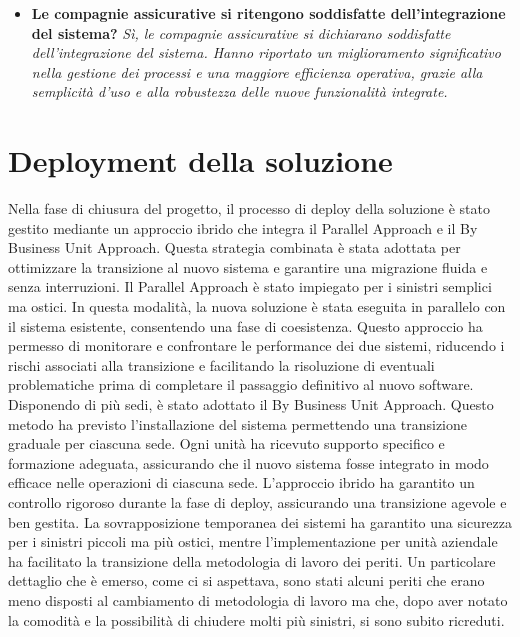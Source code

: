 \documentclass[a4paper,12pt, openright]{report}
\begin{document}
\begin{itemize}
    \item \textbf{Le compagnie assicurative si ritengono soddisfatte dell'integrazione del sistema?}
    \textit{Sì, le compagnie assicurative si dichiarano soddisfatte dell'integrazione del sistema. Hanno riportato un miglioramento significativo nella gestione dei processi e una maggiore efficienza operativa, grazie alla semplicità d'uso e alla robustezza delle nuove funzionalità integrate.}
    
\end{itemize}

\section{Deployment della soluzione}
Nella fase di chiusura del progetto, il processo di deploy della soluzione è stato gestito mediante un approccio ibrido che integra il Parallel Approach e il By Business Unit Approach. Questa strategia combinata è stata adottata per ottimizzare la transizione al nuovo sistema e garantire una migrazione fluida e senza interruzioni.
Il Parallel Approach è stato impiegato per i sinistri semplici ma ostici. In questa modalità, la nuova soluzione è stata eseguita in parallelo con il sistema esistente, consentendo una fase di coesistenza. Questo approccio ha permesso di monitorare e confrontare le performance dei due sistemi, riducendo i rischi associati alla transizione e facilitando la risoluzione di eventuali problematiche prima di completare il passaggio definitivo al nuovo software.
Disponendo di più sedi, è stato adottato il By Business Unit Approach. Questo metodo ha previsto l'installazione del sistema permettendo una transizione graduale per ciascuna sede. Ogni unità ha ricevuto supporto specifico e formazione adeguata, assicurando che il nuovo sistema fosse integrato in modo efficace nelle operazioni di ciascuna sede.
L'approccio ibrido ha garantito un controllo rigoroso durante la fase di deploy, assicurando una transizione agevole e ben gestita. La sovrapposizione temporanea dei sistemi ha garantito una sicurezza per i sinistri piccoli ma più ostici, mentre l'implementazione per unità aziendale ha facilitato la transizione della metodologia di lavoro dei periti. Un particolare dettaglio che è emerso, come ci si aspettava, sono stati alcuni periti che erano meno disposti al cambiamento di metodologia di lavoro ma che, dopo aver notato la comodità e la possibilità di chiudere molti più sinistri, si sono subito ricreduti.
\end{document}
